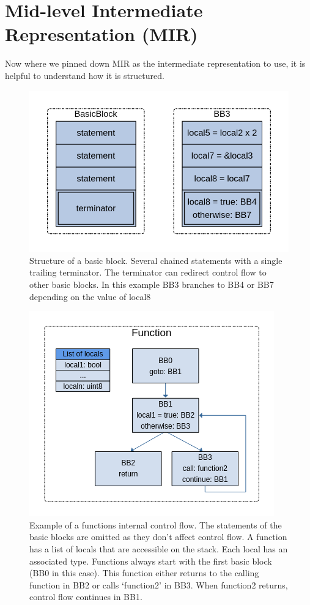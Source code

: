 \section{Mid-level Intermediate Representation (MIR)}
\label{app_mir}

Now where we pinned down MIR as the intermediate representation to use, it is helpful to understand how it is structured.

\begin{figure}
    \centering
    \includegraphics[width=.7\textwidth]{../diagrams/BasicBlock.png}
    \caption{
        Structure of a basic block. 
        Several chained statements with a single trailing terminator.
        The terminator can redirect control flow to other basic blocks.
        In this example BB3 branches to BB4 or BB7 depending on the value of local8
        }
    \label{mir_bb}
\end{figure}

\begin{figure}
    \centering
    \includegraphics[width=.7\textwidth]{../diagrams/Function.png}
    \caption{
        Example of a functions internal control flow.
        The statements of the basic blocks are omitted as they don't affect control flow.
        A function has a list of locals that are accessible on the stack.
        Each local has an associated type.
        Functions always start with the first basic block (BB0 in this case).
        This function either returns to the calling function in BB2
        or calls `function2' in BB3.
        When function2 returns, control flow continues in BB1.}
    \label{mir_fn}
\end{figure}

